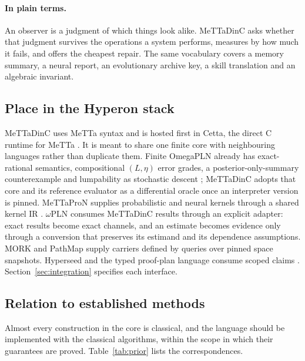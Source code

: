 \documentclass[11pt]{article}
\newcommand{\plain}{\paragraph{In plain terms.}}
\theoremstyle{definition}
\theoremstyle{plain}
\begin{document}
\plain An observer is a judgment of which things look alike. MeTTaDinC asks whether that judgment
survives the operations a system performs, measures by how much it fails, and offers the
cheapest repair. The same vocabulary covers a memory summary, a neural report, an evolutionary
archive key, a skill translation and an algebraic invariant.

\subsection{Place in the Hyperon stack}\label{sec:stack}

MeTTaDinC uses MeTTa syntax and is hosted first in Cetta, the direct C runtime for MeTTa
\cite{cettapaper}. It is meant to share one finite core with neighbouring languages rather than
duplicate them. Finite OmegaPLN already has exact-rational semantics, compositional $(L,\eta)$
error grades, a posterior-only-summary counterexample and lumpability as stochastic descent
\cite{omegapln}; MeTTaDinC adopts that core and its reference evaluator as a differential oracle
once an interpreter version is pinned. MeTTaProN supplies probabilistic and neural kernels through
a shared kernel IR \cite{mettapron}. $\omega$PLN consumes MeTTaDinC results through an explicit
adapter: exact results become exact channels, and an estimate becomes evidence only through a
conversion that preserves its estimand and its dependence assumptions. MORK and PathMap supply
carriers defined by queries over pinned space snapshots. Hyperseed and the typed proof-plan
language consume scoped claims \cite{hyperseed,proofplans}. Section~\ref{sec:integration}
specifies each interface.

\subsection{Relation to established methods}\label{sec:prior}

Almost every construction in the core is classical, and the language should be implemented with
the classical algorithms, within the scope in which their guarantees are proved.
Table~\ref{tab:prior} lists the correspondences.
\end{document}
